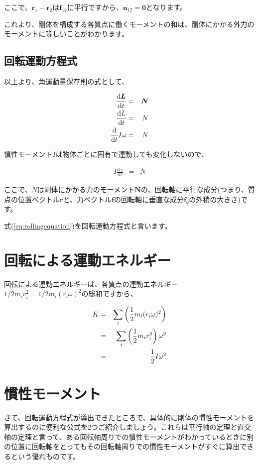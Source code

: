 ここで、$\bm{r}_1-\bm{r}_2$は$\bm{f}_{12}$に平行ですから、$\bm{n}_{12}=\bm{0}$となります。

これより、剛体を構成する各質点に働くモーメントの和は、剛体にかかる外力のモーメントに等しいことがわかります。

\subsection{回転運動方程式}

以上より、角運動量保存則の式として、

\begin{eqnarray}
    \frac{\mathrm{d}\bm{L}}{\mathrm{d}t}&=&\bm{N} \notag \\
    \frac{\mathrm{d}L}{\mathrm{d}t}&=&N \notag \\
    \frac{\mathrm{d}}{\mathrm{d}t}I\omega&=&N \notag
\end{eqnarray}

慣性モーメント$I$は物体ごとに固有で運動しても変化しないので、

\begin{eqnarray}
    I\frac{\mathrm{d}\omega}{\mathrm{d}t}&=&N
    \label{eq:rollingequation}
\end{eqnarray}

ここで、$N$は剛体にかかる力のモーメント$\bm{N}$の、回転軸に平行な成分(つまり、質点の位置ベクトル$\bm{r}$と、力ベクトル$\bm{f}$の回転軸に垂直な成分$\bm{f}_\theta$の外積の大きさ)です。

式(\ref{eq:rollingequation})を回転運動方程式と言います。



\section{回転による運動エネルギー}
回転による運動エネルギーは、各質点の運動エネルギー$1/2m_iv_i^2=1/2m_i(r_i\omega)^2$の総和ですから、

\begin{eqnarray}
    K&=&\sum_i\left(\frac{1}{2}m_i(r_i\omega)^2\right) \notag \\
    &=&\sum_i\left(\frac{1}{2}m_ir_i^2\right)\omega^2 \notag \\
    &=&\frac{1}{2}I\omega^2
\end{eqnarray}


\section{慣性モーメント}
\label{inertiamoment}
さて、回転運動方程式が導出できたところで、具体的に剛体の慣性モーメントを算出するのに便利な公式を2つご紹介しましょう。これらは平行軸の定理と直交軸の定理と言って、ある回転軸周りでの慣性モーメントがわかっているときに別の位置に回転軸をとってもその回転軸周りでの慣性モーメントがすぐに算出できるという優れものです。

